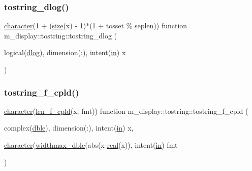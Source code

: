 \subsubsection{\texorpdfstring{tostring\+\_\+dlog()}{tostring\_dlog()}}
{\footnotesize\ttfamily \hyperlink{option__stopwatch_83_8txt_abd4b21fbbd175834027b5224bfe97e66}{character}(1 + (\hyperlink{what__overview_81_8txt_ab5692ed87074f1d5ec850a9ffa8b5af9}{size}(x) -\/ 1)$\ast$(1 + tosset \% seplen)) function m\+\_\+display\+::tostring\+::tostring\+\_\+dlog (\begin{DoxyParamCaption}\item[{logical(\hyperlink{namespacem__display_a8c6a3df510feabf6bc84dd0a8789f98c}{dlog}), dimension(\+:), intent(\hyperlink{M__journal_83_8txt_afce72651d1eed785a2132bee863b2f38}{in})}]{x }\end{DoxyParamCaption})\hspace{0.3cm}{\ttfamily [private]}}

\mbox{\label{interfacem__display_1_1tostring_a5845ff897cb6f8aca3898afddd1b1e9a}} 
\subsubsection{\texorpdfstring{tostring\+\_\+f\+\_\+cpld()}{tostring\_f\_cpld()}}
{\footnotesize\ttfamily \hyperlink{option__stopwatch_83_8txt_abd4b21fbbd175834027b5224bfe97e66}{character}(\hyperlink{namespacem__display_a803611d2a793f2a4aa7563b6c8295cb3}{len\+\_\+f\+\_\+cpld}(x, fmt)) function m\+\_\+display\+::tostring\+::tostring\+\_\+f\+\_\+cpld (\begin{DoxyParamCaption}\item[{complex(\hyperlink{namespacem__display_a46d90b75b6ccef7ccade133e5847e815}{dble}), dimension(\+:), intent(\hyperlink{M__journal_83_8txt_afce72651d1eed785a2132bee863b2f38}{in})}]{x,  }\item[{\hyperlink{option__stopwatch_83_8txt_abd4b21fbbd175834027b5224bfe97e66}{character}(\hyperlink{namespacem__display_aed07125464a462f9fa53ed2333846273}{widthmax\+\_\+dble}(abs(x-\/\hyperlink{read__watch_83_8txt_abdb62bde002f38ef75f810d3a905a823}{real}(x)), intent(\hyperlink{M__journal_83_8txt_afce72651d1eed785a2132bee863b2f38}{in})}]{fmt }\end{DoxyParamCaption})\hspace{0.3cm}{\ttfamily [private]}}

